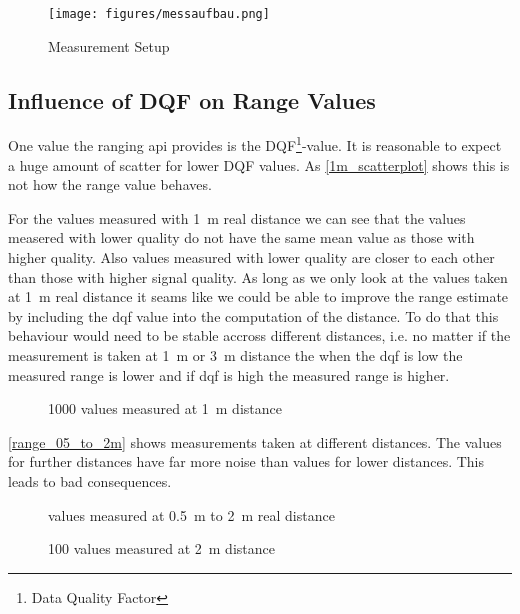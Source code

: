 \begin{figure}[H]
	\centering
	\texttt{[image: figures/messaufbau.png]}
	\caption{Measurement Setup}
	\label{aufbau}
\end{figure}


\subsection{Influence of DQF on Range Values}
One value the ranging api provides is the DQF\footnote{Data Quality Factor}-value.
It is reasonable to expect a huge amount of scatter for lower DQF values.
As \autoref{1m_scatterplot} shows this is not how the range value behaves.

For the values measured with \SI{1}{\metre} real distance we can see that the values measered with lower quality do not have the same mean value as those with higher quality.
Also values measured with lower quality are closer to each other than those with higher signal quality.
As long as we only look at the values taken at \SI{1}{\metre} real distance it seams like we could be able to improve the range estimate by including the dqf value into the computation of the distance.
To do that this behaviour would need to be stable accross different distances, i.e. no matter if the measurement is taken at \SI{1}{\metre} or \SI{3}{\metre} distance the when the dqf is low the measured range is lower and if dqf is high the measured range is higher.
\begin{figure}[H]
	\centering
	
	\caption{1000 values measured at \SI{1}{\metre} distance}
	\label{1m_scatterplot}
\end{figure}

\autoref{range_05_to_2m} shows measurements taken at different distances.
The values for further distances have far more noise than values for lower distances.
This leads to bad consequences.
\begin{figure}[H]
	\centering
	
	\caption{values measured at \SI{0.5}{\metre} to \SI{2}{\metre} real distance}
	\label{range_05_to_2m}
\end{figure}

\begin{figure}[H]
	\centering
	
	\caption{100 values measured at \SI{2}{\metre} distance}
	\label{2m}
\end{figure}

%

